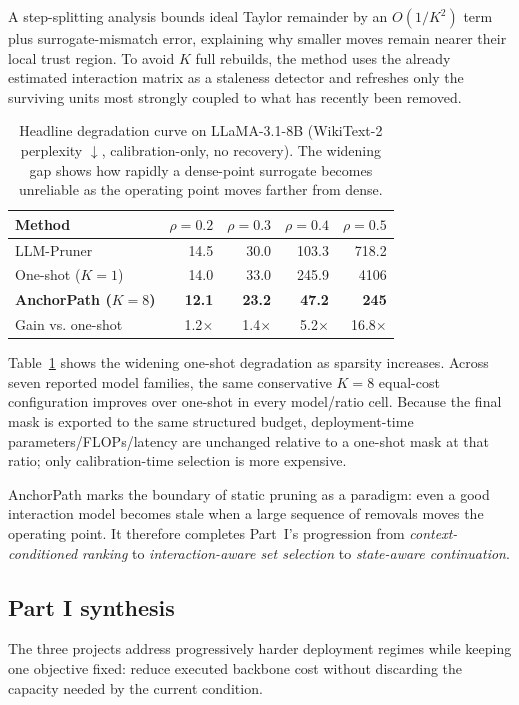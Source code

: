 \documentclass[12pt,a4paper]{article}
\newcommand{\method}[1]{{\sffamily\bfseries\color{MethodBlue}#1}}
\newcommand{\XDB}{\method{XDomainBench}}
\newcommand{\SubspacePath}{\method{SubspacePath Pruner}}
\newcommand{\AnchorPath}{\method{AnchorPath}}
\def\method#1{#1}\def\XDB{XDomainBench}\def\SubspacePath{SubspacePath Pruner}%
\begin{document}
A step-splitting analysis bounds ideal Taylor remainder by an $O(1/K^2)$ term plus surrogate-mismatch error, explaining why smaller moves remain nearer their local trust region. To avoid $K$ full rebuilds, the method uses the already estimated interaction matrix as a staleness detector and refreshes only the surviving units most strongly coupled to what has recently been removed.

\begin{table}[H]
\centering\singlespacing\small
\caption{Headline degradation curve on LLaMA-3.1-8B (WikiText-2 perplexity $\downarrow$, calibration-only, no recovery). The widening gap shows how rapidly a dense-point surrogate becomes unreliable as the operating point moves farther from dense.}
\label{tab:anchor-main}
\begin{tabular}{lrrrr}
\toprule
\textbf{Method} & $\rho=0.2$ & $\rho=0.3$ & $\rho=0.4$ & $\rho=0.5$\\
\midrule
LLM-Pruner & 14.5 & 30.0 & 103.3 & 718.2\\
One-shot ($K=1$) & 14.0 & 33.0 & 245.9 & 4106\\
\textbf{\AnchorPath{} ($K=8$)} & \textbf{12.1} & \textbf{23.2} & \textbf{47.2} & \textbf{245}\\
\midrule
Gain vs. one-shot & 1.2$\times$ & 1.4$\times$ & 5.2$\times$ & 16.8$\times$\\
\bottomrule
\end{tabular}
\end{table}

Table~\ref{tab:anchor-main} shows the widening one-shot degradation as sparsity increases. Across seven reported model families, the same conservative $K=8$ equal-cost configuration improves over one-shot in every model/ratio cell. Because the final mask is exported to the same structured budget, deployment-time parameters/FLOPs/latency are unchanged relative to a one-shot mask at that ratio; only calibration-time selection is more expensive.

\begin{insightbox}
\AnchorPath{} marks the boundary of static pruning as a paradigm: even a good interaction model becomes stale when a large sequence of removals moves the operating point. It therefore completes Part~I's progression from \emph{context-conditioned ranking} to \emph{interaction-aware set selection} to \emph{state-aware continuation}.
\end{insightbox}

\subsection{Part I synthesis}
The three projects address progressively harder deployment regimes while keeping one objective fixed: reduce executed backbone cost without discarding the capacity needed by the current condition.
\end{document}
